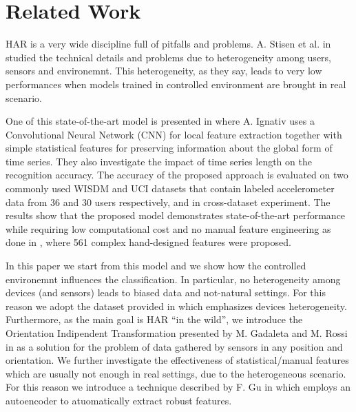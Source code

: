 
\section{Related Work}
\label{sec:related-work}

HAR is a very wide discipline full of pitfalls and problems. A. Stisen
et al. in \cite{stisen2015smart} studied the technical details and
problems due to heterogeneity among users, sensors and
environemnt. This heterogeneity, as they say, leads to very low
performances when models trained in controlled environment are brought
in real scenario.

One of this state-of-the-art model is presented in
\cite{ignatov2018real} where A. Ignativ uses a Convolutional Neural
Network (CNN) for local feature extraction together with simple
statistical features for preserving information about the global form
of time series. They also investigate the impact of time series length
on the recognition accuracy. The accuracy of the proposed approach is
evaluated on two commonly used WISDM and UCI datasets that contain
labeled accelerometer data from 36 and 30 users respectively, and in
cross-dataset experiment. The results show that the proposed model
demonstrates state-of-the-art performance while requiring low
computational cost and no manual feature engineering as done in
\cite{anguita2013public}, where 561 complex hand-designed features
were proposed.

In this paper we start from this model and we show how the controlled
environemnt influences the classification. In particular, no
heterogeneity among devices (and sensors) leads to biased data and
not-natural settings.  For this reason we adopt the dataset provided
in \cite{stisen2015smart} which emphasizes devices heterogeneity.
Furthermore, as the main goal is HAR ``in the wild'', we introduce the
Orientation Indipendent Transformation presented by M. Gadaleta and
M. Rossi in \cite{gadaleta2018idnet} as a solution for the problem of
data gathered by sensors in any position and orientation. We further investigate the
effectiveness of statistical/manual features which are usually not
enough in real settings, due to the heterogeneous scenario. For this
reason we introduce a technique described by F. Gu in
\cite{gu2018locomotion} which employs an autoencoder to atuomatically
extract robust features.
